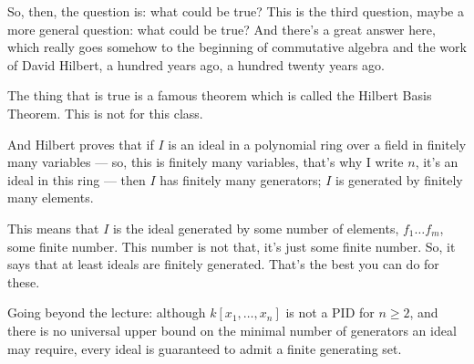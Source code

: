 \begin{speech}[00:02:03 - 00:03:30]
So, then, the question is: what could be true?  This is the third question,  maybe a more general question: what could be true? And there's a great answer here, which really goes somehow to the beginning of commutative algebra and the work of David Hilbert, a hundred years ago,  a hundred twenty years ago.

The thing that is true is a famous theorem which is called the Hilbert Basis Theorem.  This is not for this class. 

And Hilbert proves that if  $I$ is an ideal in a polynomial ring over a field in finitely many variables ---  so, this is finitely many variables, that's why I write $n$, it's an ideal in this ring --- then  $I$ has finitely many generators; $I$ is generated by finitely many elements. 

This means that $I$  is the ideal generated by some number of elements, $f_1 \dots f_m$, some finite number. This number is not that, it's just some finite number. So, it says that at least ideals are finitely generated. That's the best you can do for these.
\end{speech}

\begin{content}

\begin{steps}
Going beyond the lecture: although $k[x_1, \dots, x_n]$ is not a PID for $n \ge 2$, and there is no universal upper bound on the minimal number of generators an ideal may require, every ideal is guaranteed to admit a finite generating set.
\end{steps}
\end{content}

